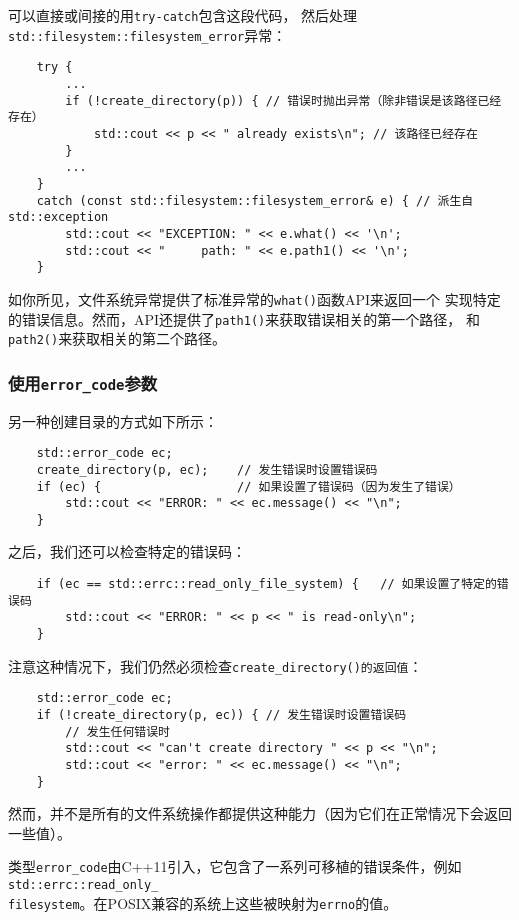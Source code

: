 可以直接或间接的用\texttt{try-catch}包含这段代码，
然后处理\texttt{std::filesystem::filesystem\_error}异常：
\begin{lstlisting}
    try {
        ...
        if (!create_directory(p)) { // 错误时抛出异常（除非错误是该路径已经存在）
            std::cout << p << " already exists\n"; // 该路径已经存在
        }
        ...
    }
    catch (const std::filesystem::filesystem_error& e) { // 派生自std::exception
        std::cout << "EXCEPTION: " << e.what() << '\n';
        std::cout << "     path: " << e.path1() << '\n';
    }
\end{lstlisting}
如你所见，文件系统异常提供了标准异常的\texttt{what()}函数API来返回一个
实现特定的错误信息。然而，API还提供了\texttt{path1()}来获取错误相关的第一个路径，
和\texttt{path2()}来获取相关的第二个路径。

\subsubsection{使用\texttt{error\_code}参数}\label{ch20.2.6.2}
另一种创建目录的方式如下所示：
\begin{lstlisting}
    std::error_code ec;
    create_directory(p, ec);    // 发生错误时设置错误码
    if (ec) {                   // 如果设置了错误码（因为发生了错误）
        std::cout << "ERROR: " << ec.message() << "\n";
    }
\end{lstlisting}
之后，我们还可以检查特定的错误码：
\begin{lstlisting}
    if (ec == std::errc::read_only_file_system) {   // 如果设置了特定的错误码
        std::cout << "ERROR: " << p << " is read-only\n";
    }
\end{lstlisting}
注意这种情况下，我们仍然必须检查\texttt{create\_directory()的返回值}：
\begin{lstlisting}
    std::error_code ec;
    if (!create_directory(p, ec)) { // 发生错误时设置错误码
        // 发生任何错误时
        std::cout << "can't create directory " << p << "\n";
        std::cout << "error: " << ec.message() << "\n";
    }
\end{lstlisting}
然而，并不是所有的文件系统操作都提供这种能力（因为它们在正常情况下会返回一些值）。

类型\texttt{error\_code}由C++11引入，它包含了一系列可移植的错误条件，例如
\texttt{std::errc::read\_only\_\\
filesystem}。在POSIX兼容的系统上这些被映射为\texttt{errno}的值。

